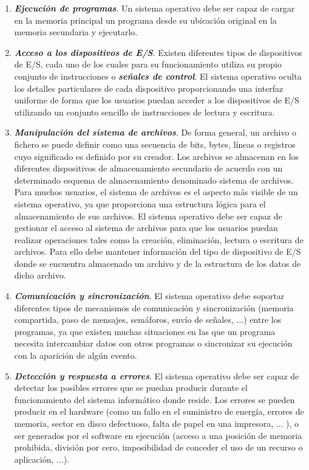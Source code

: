 \documentclass[12pt]{article}
\begin{document}
\begin{enumerate}
\item \textbf{\textit{Ejecución de programas}}. Un sistema operativo debe ser capaz de cargar en la memoria principal un programa desde su ubicación original en la memoria secundaria y ejecutarlo.
\item \textbf{\textit{Acceso a los dispositivos de E/S}}. Existen diferentes tipos de dispositivos de E/S, cada uno de los cuales para su funcionamiento utiliza su propio conjunto de instrucciones o \textbf{\textit{señales de control}}. El sistema operativo oculta los detalles particulares de cada dispositivo proporcionando una interfaz uniforme de forma que los usuarios puedan acceder a los dispositivos de E/S utilizando un conjunto sencillo de instrucciones de lectura y escritura.

\item \textbf{\textit{Manipulación del sistema de archivos}}. De forma general, un archivo o fichero se puede definir como una secuencia de bits, bytes, líneas o registros cuyo significado es definido por su creador. Los archivos se almacenan en los diferentes dispositivos de almacenamiento secundario de acuerdo con un determinado esquema de almacenamiento denominado sistema de archivos. Para
muchos usuarios, el sistema de archivos es el aspecto más visible de un sistema operativo, ya que
proporciona una estructura lógica para el almacenamiento de sus archivos. El sistema operativo
debe ser capaz de gestionar el acceso al sistema de archivos para que los usuarios puedan realizar
operaciones tales como la creación, eliminación, lectura o escritura de archivos. Para ello debe mantener información del tipo de dispositivo de E/S donde se encuentra almacenado un archivo y de
la estructura de los datos de dicho archivo.

\item \textbf{\textit{Comunicación y sincronización}}. El sistema operativo debe soportar diferentes tipos de mecanismos de comunicación y sincronización (memoria compartida, paso de mensajes, semáforos, envío de señales, $\ldots$) entre los programas, ya que existen muchas situaciones en las que un programa necesita intercambiar datos con otros programas o sincronizar su ejecución con la aparición de algún evento.

\item \textbf{\textit{Detección y respuesta a errores}}. El sistema operativo debe ser capaz de detectar los posibles errores que se puedan producir durante el funcionamiento del sistema informático donde reside. Los errores se pueden producir en el hardware (como un fallo en el suministro de energía, errores de memoria, sector en disco defectuoso, falta de papel en una impresora, ... ), o ser generados por el software en ejecución (acceso a una posición de memoria prohibida, división por cero, imposibilidad de conceder el uso de un recurso o aplicación, $\ldots$).


\end{enumerate}
\end{document}

